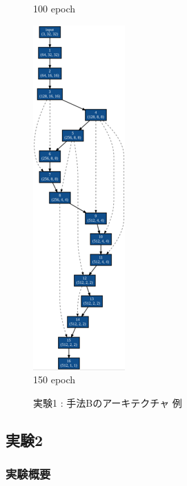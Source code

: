 \begin{figure}[tb]
\begin{minipage}{0.3\hsize}
\begin{center}
    100 epoch
 	\end{center}
 \end{minipage}
 \begin{minipage}{0.3\hsize}
 	\begin{center}
    \includegraphics[clip,scale=0.8]{./fig/04.exp/b150.png}\\
    150 epoch
 	\end{center}
 \end{minipage}
 \caption{実験1 : 手法Bのアーキテクチャ 例}
 \label{fig:exp1_b}
\end{figure}










\clearpage\newpage
\changeindent{0cm}
\subsection{実験2}
\label{sec:exp.02}
\changeindent{2cm}



\changeindent{0cm}
\subsubsection{実験概要}
\label{sec:exp.02_01}
\changeindent{2cm}

